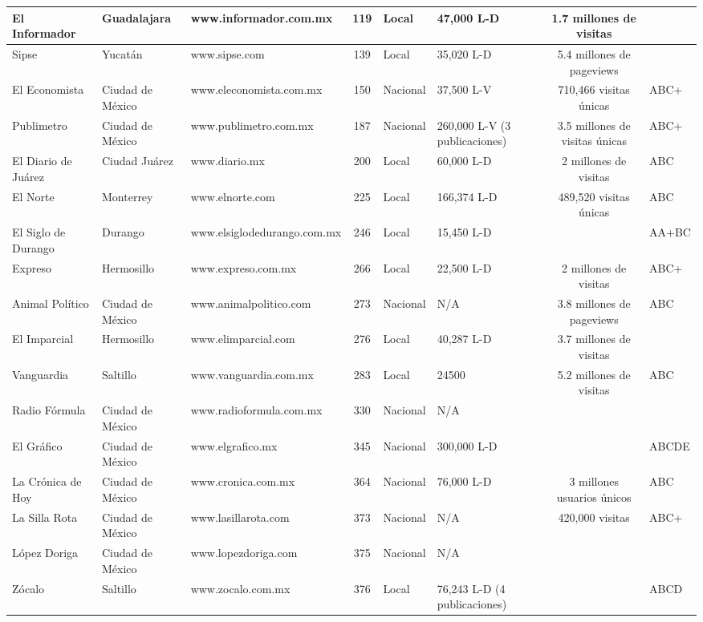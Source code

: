 \documentclass[letterpaper, 11pt]{book}
\theoremstyle{definition}
\theoremstyle{remark}
\begin{document}
\begin{table}[!hbt]
{\begin{tabular}{ | l | l | l | c | l | l | c | l | }
\hline
El Informador & Guadalajara & www.informador.com.mx & 119 & Local &  47,000 L-D & 1.7 millones de visitas & \\
\hline
Sipse & Yucatán & www.sipse.com & 139 & Local &  35,020 L-D & 5.4 millones de pageviews & \\
\hline
El Economista & Ciudad de México & www.eleconomista.com.mx & 150 & Nacional & 37,500 L-V & 710,466 visitas únicas & ABC+\\
\hline
Publimetro & Ciudad de México & www.publimetro.com.mx & 187 & Nacional & 260,000 L-V (3 publicaciones) & 3.5 millones de visitas únicas & ABC+\\
\hline
El Diario de Juárez & Ciudad Juárez & www.diario.mx & 200 & Local & 60,000 L-D & 2 millones de visitas & ABC\\
\hline
El Norte & Monterrey & www.elnorte.com & 225 & Local & 166,374 L-D & 489,520 visitas únicas & ABC\\
\hline
El Siglo de Durango & Durango & www.elsiglodedurango.com.mx & 246 & Local & 15,450 L-D &  &  AA+BC\\
\hline
Expreso & Hermosillo & www.expreso.com.mx & 266 & Local &  22,500 L-D & 2 millones de visitas &  ABC+\\
\hline
Animal Político & Ciudad de México & www.animalpolitico.com & 273 & Nacional & N/A & 3.8 millones de pageviews & ABC\\
\hline
El Imparcial & Hermosillo & www.elimparcial.com & 276 & Local &  40,287 L-D & 3.7 millones de visitas & \\
\hline
Vanguardia & Saltillo & www.vanguardia.com.mx & 283 & Local & 24500 & 5.2 millones de visitas & ABC\\
\hline
Radio Fórmula & Ciudad de México & www.radioformula.com.mx & 330 & Nacional & N/A &  & \\
\hline
El Gráfico & Ciudad de México & www.elgrafico.mx & 345 & Nacional & 300,000 L-D &  & ABCDE\\
\hline
La Crónica de Hoy & Ciudad de México & www.cronica.com.mx & 364 & Nacional & 76,000 L-D & 3 millones usuarios únicos & ABC\\
\hline
La Silla Rota & Ciudad de México & www.lasillarota.com & 373 & Nacional & N/A & 420,000 visitas &  ABC+\\
\hline
López Doriga & Ciudad de México & www.lopezdoriga.com & 375 & Nacional & N/A &  & \\
\hline
Zócalo & Saltillo & www.zocalo.com.mx & 376 & Local & 76,243 L-D (4 publicaciones) &  & ABCD\\

\end{tabular}}
\end{table}
\end{document}
